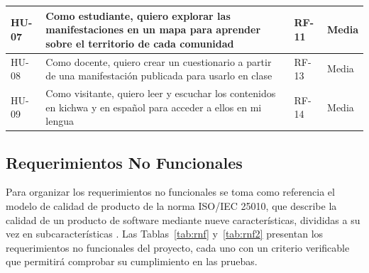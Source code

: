 {\begin{tabular}{|p{}|p{}|p{}|p{}|}
    \hline
    \raggedright\hspace{0pt}HU-07 & \raggedright\hspace{0pt}Como estudiante, quiero explorar las manifestaciones en un mapa para aprender sobre el territorio de cada comunidad & \raggedright\hspace{0pt}RF-11 & \raggedright\hspace{0pt}Media \tabularnewline
    \hline
    \raggedright\hspace{0pt}HU-08 & \raggedright\hspace{0pt}Como docente, quiero crear un cuestionario a partir de una manifestación publicada para usarlo en clase & \raggedright\hspace{0pt}RF-13 & \raggedright\hspace{0pt}Media \tabularnewline
    \hline
    \raggedright\hspace{0pt}HU-09 & \raggedright\hspace{0pt}Como visitante, quiero leer y escuchar los contenidos en kichwa y en español para acceder a ellos en mi lengua & \raggedright\hspace{0pt}RF-14 & \raggedright\hspace{0pt}Media \tabularnewline
    \hline
  \end{tabular}\par}

\subsection{Requerimientos No Funcionales}
Para organizar los requerimientos no funcionales se toma como referencia el modelo de calidad de producto de la norma ISO/IEC 25010, que describe la calidad de un producto de software mediante nueve características, divididas a su vez en subcaracterísticas \cite{iso2023quality}. Las Tablas~\ref{tab:rnf} y~\ref{tab:rnf2} presentan los requerimientos no funcionales del proyecto, cada uno con un criterio verificable que permitirá comprobar su cumplimiento en las pruebas.


